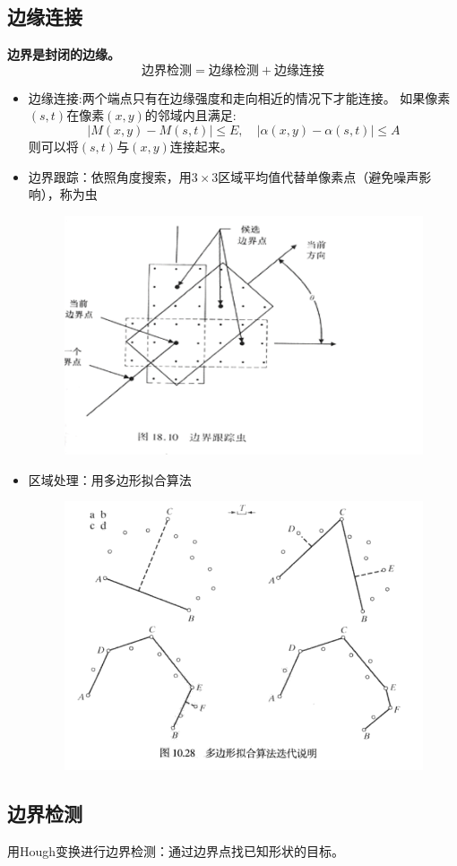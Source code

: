 \subsection{边缘连接}
\textbf{边界是封闭的边缘。}
\[\text{边界检测}=\text{边缘检测}+\text{边缘连接}\]

\begin{itemize}
\item 边缘连接:两个端点只有在边缘强度和走向相近的情况下才能连接。
如果像素$(s,t)$在像素$(x,y)$的邻域内且满足:
\[|M(x,y)-M(s,t)|\leq E,\quad |\alpha(x,y)-\alpha(s,t)|\leq A\]
则可以将$(s,t)$与$(x,y)$连接起来。

\item 边界跟踪：依照角度搜索，用$3\times 3$区域平均值代替单像素点（避免噪声影响），称为虫
\begin{figure}[H]
\centering
\includegraphics[width=0.5\linewidth]{fig/boundary_tracing.png}
\end{figure}

\item 区域处理：用多边形拟合算法
\begin{figure}[H]
\centering
\includegraphics[width=0.5\linewidth]{fig/polygon_boundary.png}
\end{figure}
\end{itemize}

\subsection{边界检测}
用Hough变换进行边界检测：通过边界点找已知形状的目标。 %

